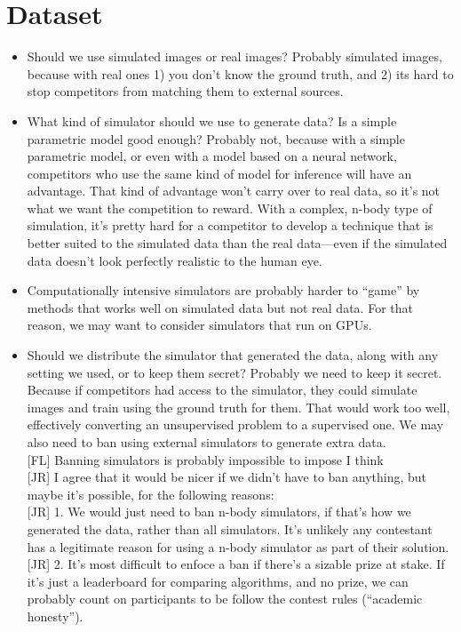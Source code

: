 \documentclass[10pt,letter]{article}
\newcommand{\fl}[1]{{\color{magenta}[FL] #1}}
\newcommand{\jr}[1]{{\color{blue}[JR] #1}}
\begin{document}
\section{Dataset}

\begin{itemize}
\item Should we use simulated images or real images? Probably simulated images, because with real ones 1) you don't know the ground truth, and 2) its hard to stop competitors from matching them to external sources. 
\item What kind of simulator should we use to generate data? Is a simple parametric model good enough? Probably not, because with a simple parametric model, or even with a model based on a neural network, competitors who use the same kind of model for inference will have an advantage. That kind of advantage won't carry over to real data, so it's not what we want the competition to reward. With a complex, n-body type of simulation, it's pretty hard for a competitor to develop a technique that is better suited to the simulated data than the real data---even if the simulated data doesn't look perfectly realistic to the human eye.
\item Computationally intensive simulators are probably harder to ``game'' by methods that works well on simulated data but not real data. For that reason, we may want to consider simulators that run on GPUs. 
\item Should we distribute the simulator that generated the data, along with any setting we used, or to keep them secret? Probably we need to keep it secret. Because if competitors had access to the simulator, they could simulate images and train using the ground truth for them. That would work too well, effectively converting an unsupervised problem to a supervised one. We may also need to ban using external simulators to generate extra data.\\
\fl{Banning simulators is probably impossible to impose I think}\\
\jr{I agree that it would be nicer if we didn't have to ban anything, but maybe it's possible, for the following reasons:}\\
\jr{1. We would just need to ban n-body simulators, if that's how we generated the data, rather than all simulators. It's unlikely any contestant has a legitimate reason for using a n-body simulator as part of their solution.}\\
\jr{2. It's most difficult to enfoce a ban if there's a sizable prize at stake. If it's just a leaderboard for comparing algorithms, and no prize, we can probably count on participants to be follow the contest rules (``academic honesty'').}\\

\end{itemize}
\end{document}
